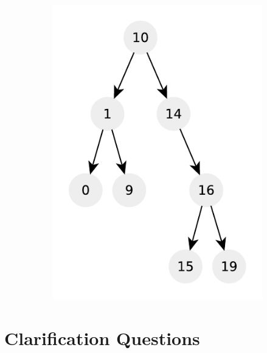 \begin{figure}
\begin{subfigure}[t]{0.30\textwidth}
		 \includegraphics[width=1\linewidth]{sources/verify_BST/images/example4}
		 \label{fig:verify:example4}
	  \end{subfigure}
	 \caption[]{}
	  \label{fig:verify:trees}
\end{figure}



\section{Clarification Questions}

